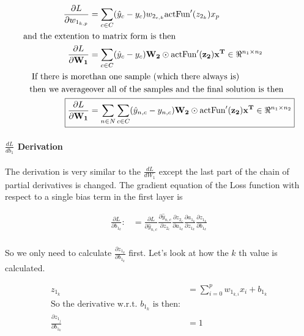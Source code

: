 \documentclass[]{article}
\begin{document}
\begin{align*}
\frac{\partial L}{\partial w_{1_{k,p}}} &= \sum_{c\in C}( \hat{y}_c - y_c) w_{2_{c,k}}\text{actFun}'(z_{2_k})x_p \\
\text{and the extention}&\text{ to matrix form is then} \\
\frac{\partial L}{\partial \mathbf{W_1}} &= \sum_{c\in C}( \hat{y}_c - y_c) \mathbf{W_2}  \odot \text{actFun}'(\mathbf{z_2})\mathbf{x^T} \in \Re^{n_1 \times n_2} \\
\text{If there is more}&\text{than one sample (which there always is)}\\
\text{then we average}&\text{over all of the samples and the final solution is then} \\
\Aboxed{\frac{\partial L}{\partial \mathbf{W_1}} &=\sum_{n\in N} \sum_{c\in C}( \hat{y}_{n,c} - y_{n,c}) \mathbf{W_2}  \odot \text{actFun}'(\mathbf{z_2})\mathbf{x^T} \in \Re^{n_1 \times n_2}} \\
\end{align*}

\paragraph{$\frac{dL}{db_1}$ Derivation}
The derivation is very similar to the $\frac{dL}{dW_1}$ except the last part of the chain of partial derivatives is changed. The gradient equation of the Loss function with respect to a single bias term in the first layer is 

\begin{align*}
\frac{\partial L}{\partial b_{1_{k}}} : &=  \frac{\partial L }{\partial  \hat{y}_{n,c} } \frac{\partial  \hat{y}_{n,c} }{\partial z_{2_c}} \frac{\partial z_{2_c}}{\partial a_{1_k}}\frac{\partial a_{1_k}}{\partial z_{1_k}} \frac{\partial z_{1_k}}{\partial b_{1_{k}}}  \\
\end{align*}

So we only need to calculate $\frac{\partial z_{1_k}} {\partial b_{1_{k}} }$ first. Let's look at how the $k$ th value is calculated. 

\begin{align*}
z_{1_k} &= \sum_{i = 0}^p w_{1_{k,i}}x_i + b_{1_k} \\
\text{So the derivative w.r.t. $b_{1_{k}}$ is then:}\\
\frac{\partial z_{1_j} }{\partial b_{1_{k}}} &= 1 \\
\end{align*}
\end{document}

